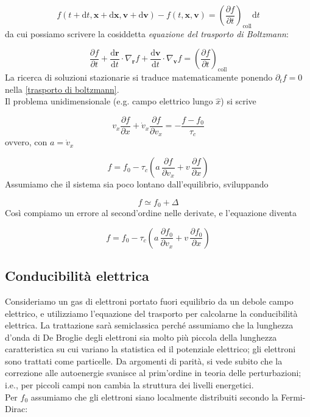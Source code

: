 \documentclass[a4paper]{report}
\begin{document}
\begin{equation}
     f(t+\mathrm{d}t, \mathbf{x}+\mathrm{
    d}\mathbf{x},  \mathbf{v}+\mathrm{
    d}\mathbf{v}) - f(t,\mathbf{x},\mathbf{v}) =  \left(\frac{\partial f}{\partial t}\right)_{\text{coll}} \mathrm{d}t
\end{equation}
da cui possiamo scrivere la cosiddetta \textit{equazione del trasporto di Boltzmann}:

\begin{equation}
    \frac{\partial f}{\partial t} + \frac{\mathrm{d}\mathbf{r}}{\mathrm{d}t}\cdot \nabla_\mathbf{r} f + \frac{\mathrm{d}\mathbf{v}}{\mathrm{d}t}\cdot \nabla_\mathbf{v} f = \left(\frac{\partial f}{\partial t}\right)_{\text{coll}}
    \label{trasporto di boltzmann}
\end{equation}
La ricerca di soluzioni stazionarie si traduce matematicamente ponendo $\partial_t f = 0$ nella \eqref{trasporto di boltzmann}. \\
Il problema unidimensionale (e.g. campo elettrico lungo $\hat{x}$) si scrive

\begin{equation}
    v_x \frac{\partial f}{\partial x} + \dot{v}_x \frac{\partial f}{\partial v_x} = -\frac{f-f_0}{\tau_c}
\end{equation}
ovvero, con $a = \dot{v}_x$

\begin{equation}
    f = f_0 - \tau_c \left(a \,\frac{\partial f}{\partial v_x} + v\, \frac{\partial f}{\partial x}\right)
\end{equation}
Assumiamo che il sistema sia poco lontano dall'equilibrio, sviluppando

\begin{equation}
    f \simeq f_0 + \Delta
\end{equation}
Così compiamo un errore al second'ordine nelle derivate, e l'equazione diventa 

\begin{equation}
    f = f_0 - \tau_c \left(a \,\frac{\partial f_0}{\partial v_x} + v\, \frac{\partial f_0}{\partial x}\right)
\end{equation}

\subsection{Conducibilità elettrica}

Consideriamo un gas di elettroni portato fuori equilibrio da un debole campo elettrico, e utilizziamo l'equazione del trasporto per calcolarne la conducibilità elettrica. La trattazione sarà semiclassica perché assumiamo che la lunghezza d'onda di De Broglie degli elettroni sia molto più piccola della lunghezza caratteristica su cui variano la statistica ed il potenziale elettrico; gli elettroni sono trattati come particelle. Da argomenti di parità, si vede subito che la correzione alle autoenergie svanisce al prim'ordine in teoria delle perturbazioni; i.e., per piccoli campi non cambia la struttura dei livelli energetici. \\
Per $f_0$ assumiamo che gli elettroni siano localmente distribuiti secondo la Fermi-Dirac:
\end{document}
